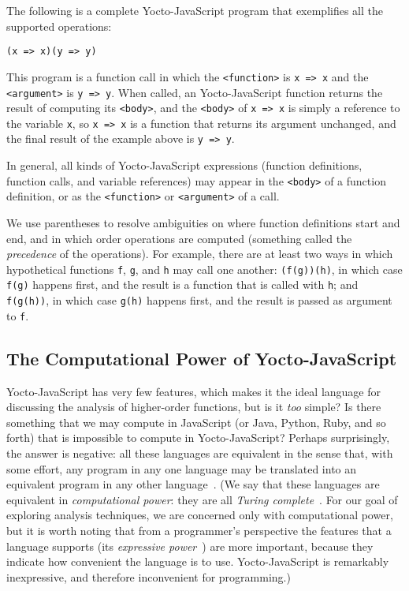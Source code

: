 \documentclass[12pt, oneside]{book}
\begin{document}
The following is a complete Yocto-JavaScript program that exemplifies all the supported operations:

\begin{verbatim}
(x => x)(y => y)
\end{verbatim}

This program is a function call in which the \verb!<function>! is \texttt{x => x} and the \verb!<argument>! is \texttt{y => y}. When called, an Yocto-JavaScript function returns the result of computing its \verb!<body>!, and the \verb!<body>! of \texttt{x => x} is simply a reference to the variable \texttt{x}, so \texttt{x => x} is a function that returns its argument unchanged, and the final result of the example above is \texttt{y => y}.

In general, all kinds of Yocto-JavaScript expressions (function definitions, function calls, and variable references) may appear in the \verb!<body>! of a function definition, or as the \verb!<function>! or \verb!<argument>! of a call.

We use parentheses to resolve ambiguities on where function definitions start and end, and in which order operations are computed (something called the \emph{precedence} of the operations). For example, there are at least two ways in which hypothetical functions \texttt{f}, \texttt{g}, and \texttt{h} may call one another: \texttt{(f(g))(h)}, in which case \texttt{f(g)} happens first, and the result is a function that is called with \texttt{h}; and \texttt{f(g(h))}, in which case \texttt{g(h)} happens first, and the result is passed as argument to \texttt{f}.

\subsection{The Computational Power of Yocto-JavaScript}

Yocto-JavaScript has very few features, which makes it the ideal language for discussing the analysis of higher-order functions, but is it \emph{too} simple? Is there something that we may compute in JavaScript (or Java, Python, Ruby, and so forth) that is impossible to compute in Yocto-JavaScript? Perhaps surprisingly, the answer is negative: all these languages are equivalent in the sense that, with some effort, any program in any one language may be translated into an equivalent program in any other language~\cite[§~6]{understanding-computation}. (We say that these languages are equivalent in \emph{computational power}: they are all \emph{Turing complete}~\cite[§~7]{understanding-computation}. For our goal of exploring analysis techniques, we are concerned only with computational power, but it is worth noting that from a programmer’s perspective the features that a language supports (its \emph{expressive power}~\cite{expressive-power}) are more important, because they indicate how convenient the language is to use. Yocto-JavaScript is remarkably inexpressive, and therefore inconvenient for programming.)
\end{document}
